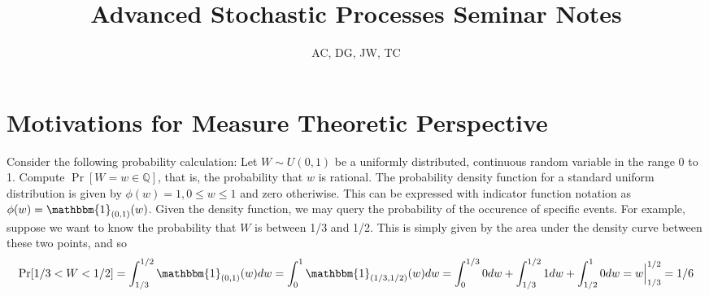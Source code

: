 \documentclass[10pt, oneside]{article}
\title{Advanced Stochastic Processes Seminar Notes}
\author{AC, DG, JW, TC}
\newcommand{\Q}{\mathbb{Q}}
\begin{document}
\maketitle
\tableofcontents

\vspace{.25in}

\section{Motivations for Measure Theoretic Perspective}
Consider the following probability calculation: Let $W\sim U(0,1)$ be a uniformly distributed, continuous random variable in the range 0 to 1. Compute $\Pr[W=w\in \Q]$, that is, the probability that $w$ is rational.
The probability density function for a standard uniform distribution is given by $\phi(w)=1,0\le w\le1$ and zero otheriwise. 
This can be expressed with indicator function notation as $\phi(w)=\mathbbm{1}_{(0,1)}(w)$.
Given the density function, we may query the probability of the occurence of specific events.
For example, suppose we want to know the probability that $W$ is between 1/3 and 1/2.
This is simply given by the area under the density curve between these two points, and so
$$\Pr[1/3<W<1/2]=\int_{1/3}^{1/2}\mathbbm{1}_{(0,1)}(w)dw=\int_{0}^{1}\mathbbm{1}_{(1/3,1/2)}(w)dw=\int_{0}^{1/3}0dw+\int_{1/3}^{1/2}1dw+\int_{1/2}^{1}0dw=w\Big|_{1/3}^{1/2}=1/6$$
\end{document}
